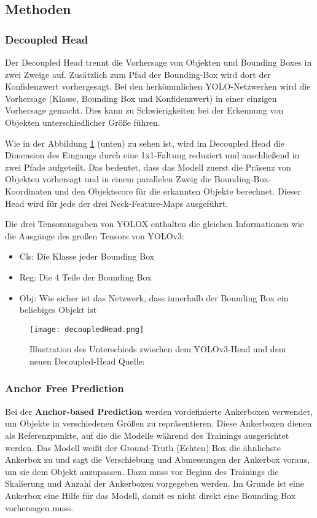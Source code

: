 \subsection{Methoden}
\subsubsection{Decoupled Head}\label{chap:decoupledHead}
Der Decoupled Head trennt die Vorhersage von Objekten und Bounding Boxes in zwei Zweige auf. Zusätzlich zum Pfad der Bounding-Box wird dort der Konfidenzwert vorhergesagt. Bei den herkömmlichen YOLO-Netzwerken wird die Vorhersage (Klasse, Bounding Box und Konfidenzwert) in einer einzigen Vorhersage gemacht. Dies kann zu Schwierigkeiten bei der Erkennung von Objekten unterschiedlicher Größe führen. 

Wie in der Abbildung \ref{fig:decoupledHead} (unten) zu sehen ist, wird im Decoupled Head die Dimension des Eingangs durch eine 1x1-Faltung reduziert und anschließend in zwei Pfade aufgeteilt. Das bedeutet, dass das Modell zuerst die Präsenz von Objekten vorhersagt und in einem parallelen Zweig die Bounding-Box-Koordinaten und den Objektscore für die erkannten Objekte berechnet. Dieser Head wird für jede der drei Neck-Feature-Maps ausgeführt. \cite{yoloxExplanationHowWorks}

Die drei Tensorausgaben von YOLOX enthalten die gleichen Informationen wie die Ausgänge des großen Tensors von YOLOv3:
\begin{itemize}
\item Cls: Die Klasse jeder Bounding Box
\item Reg: Die 4 Teile der Bounding Box
\item Obj: Wie sicher ist das Netzwerk, dass innerhalb der Bounding Box ein beliebiges Objekt ist
\end{itemize}


\begin{figure}[h]
	\centering
	\texttt{[image: decoupledHead.png]}
	\caption[Illustration des Unterschieds zwischen dem Yolov3-Head und dem neuen Decoupled-Head ]{Illustration des Unterschieds zwischen dem YOLOv3-Head und dem neuen Decoupled-Head Quelle: \cite{yoloxPaper}}
	\label{fig:decoupledHead}
\end{figure}




\subsubsection{Anchor Free Prediction}\label{chap:anchorFree}
Bei der \textbf{Anchor-based Prediction} werden vordefinierte Ankerboxen verwendet, um Objekte in verschiedenen Größen zu repräsentieren. Diese Ankerboxen dienen als Referenzpunkte, auf die die Modelle während des Trainings ausgerichtet werden. Das Modell weißt der Ground-Truth (Echten) Box die ähnlichste Ankerbox zu und sagt die Verschiebung und Abmessungen der Ankerbox voraus, um sie dem Objekt anzupassen. Dazu muss vor Beginn des Trainings die Skalierung und Anzahl der Ankerboxen vorgegeben werden. Im Grunde ist eine Ankerbox eine Hilfe für das Modell, damit es nicht direkt eine Bounding Box vorhersagen muss.



